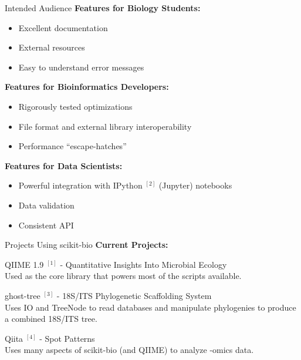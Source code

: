 \documentclass[final,t]{beamer}
\begin{document}
\begin{frame}{}
\begin{columns}[t]
\begin{column}{.3\linewidth}
        \begin{block}{Intended Audience}
            \textbf{Features for Biology Students:}
            \begin{itemize}
                \item[$\bullet$]Excellent documentation
                \item[$\bullet$]External resources
                \item[$\bullet$]Easy to understand error messages
            \end{itemize}
            \vspace{1cm}
            \textbf{Features for Bioinformatics Developers:}
            \begin{itemize}
                \item[$\bullet$]Rigorously tested optimizations
                \item[$\bullet$]File format and external library interoperability
                \item[$\bullet$]Performance ``escape-hatches''
            \end{itemize}
            \vspace{1cm}
            \textbf{Features for Data Scientists:}
            \begin{itemize}
                \item[$\bullet$]Powerful integration with IPython $^{[2]}$ (Jupyter) notebooks
                \item[$\bullet$]Data validation
                \item[$\bullet$]Consistent API
            \end{itemize}
        \end{block}


        \begin{block}{Projects Using scikit-bio}
            \textbf{Current Projects:} \\
            \begin{itemize}{\fontsize{28pt}{36pt}
              \item[$\bullet$] QIIME 1.9 $^{[1]}$ - Quantitative Insights Into Microbial Ecology \hfill \\
              Used as the core library that powers most of the scripts available.
              \newline
              \item[$\bullet$] ghost-tree $^{[3]}$ - 18S/ITS Phylogenetic Scaffolding System \hfill \\
              Uses IO and TreeNode to read databases and manipulate phylogenies to produce a combined 18S/ITS tree.
              \newline
              \item[$\bullet$] Qiita $^{[4]}$ - Spot Patterns \hfill \\
              Uses many aspects of scikit-bio (and QIIME) to analyze -omics data.
              \newline
              }
            \end{itemize}


\end{block}
\end{column}
\end{columns}
\end{frame}
\end{document}

